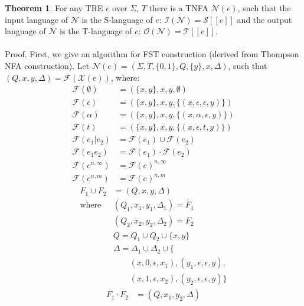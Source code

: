 \documentclass{article}
\newcommand{\Xeq}{\!=\!}
\newcommand{\Xlb}{[\![}
\newcommand{\Xrb}{]\!]}
\newcommand{\XF}{\mathcal{F}}
\newcommand{\XI}{\mathcal{I}}
\newcommand{\XN}{\mathcal{N}}
\newcommand{\XO}{\mathcal{O}}
\newcommand{\XS}{\mathcal{S}}
\newcommand{\XT}{\mathcal{T}}
\newcommand{\XX}{\mathcal{X}}
\theoremstyle{definition}
\newtheorem{XThe}{Theorem}
\begin{document}
\begin{multicols}{2}
\begin{XThe}\label{theorem_tnfa}
For any TRE $e$ over $\Sigma$, $T$ there is a TNFA $\XN(e)$, such that
the input language of $\XN$ is the S-language of $e$:
$\XI(\XN) \Xeq \XS \Xlb e \Xrb$ and
the output language of $\XN$ is the T-language of $e$:
$\XO(\XN) \Xeq \XT \Xlb e \Xrb$.
\\ \\
Proof.
First, we give an algorithm for FST construction (derived from Thompson NFA construction).
Let $\XN(e) \Xeq (\Sigma, T, \{0, 1\}, Q, \{ y \}, x, \Delta)$, such that $(Q, x, y, \Delta) \Xeq \XF(\XX(e))$, where:
    \begin{align*}
        \XF(\emptyset) &= (\{ x, y \}, x, y, \emptyset) \tag{1a} \\
        \XF(\epsilon) &= (\{ x, y \}, x, y, \{ (x, \epsilon, \epsilon, y) \}) \tag{1b} \\
        \XF(\alpha) &= (\{ x, y \}, x, y, \{ (x, \alpha, \epsilon, y) \}) \tag{1c} \\
        \XF(t) &= (\{ x, y \}, x, y, \{ (x, \epsilon, t, y) \}) \tag{1d} \\
        \XF(e_1 | e_2) &= \XF(e_1) \cup \XF(e_2) \tag{1e} \label{tnfaalt} \\
        \XF(e_1 e_2) &= \XF(e_1) \cdot \XF(e_2) \tag{1f} \label{tnfacat} \\
        \XF(e^{n,\infty}) &= \XF(e)^{n,\infty} \tag{1g} \label{tnfaunbounditer} \\
        \XF(e^{n,m}) &= \XF(e)^{n, m} \tag{1h} \label{tnfabounditer}
    \end{align*}
%
    \begin{align*}
        F_1 \cup F_2 &= (Q, x, y, \Delta) \tag{1i} \label{tnfaaltconstr} \\
        \text{where }
            & (Q_1, x_1, y_1, \Delta_1) = F_1 \\
            & (Q_2, x_2, y_2, \Delta_2) = F_2 \\
            & Q = Q_1 \cup Q_2 \cup \{ x, y \} \\
            & \Delta = \Delta_1 \cup \Delta_2 \cup \{ \\
                & \qquad (x, 0, \epsilon, x_1), (y_1, \epsilon, \epsilon, y), \\
                & \qquad (x, 1, \epsilon, x_2), (y_2, \epsilon, \epsilon, y) \}
    \end{align*}
%
    \begin{align*}
        F_1 \cdot F_2 &= (Q, x_1, y_2, \Delta) \tag{1j} \label{tnfacatconstr} \\

\end{align*}
\end{XThe}
\end{multicols}
\end{document}
